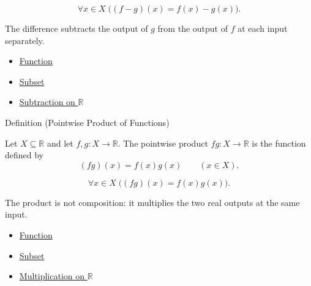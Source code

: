 \begin{remark*}
\[
  \forall x\in X\;\bigl((f-g)(x)=f(x)-g(x)\bigr).
\]
\end{remark*}

\begin{remark*}[Interpretation]
The difference subtracts the output of $g$ from the output of $f$ at each
input separately.
\end{remark*}

\begin{dependencies}
\begin{itemize}
  \item \hyperref[def:function]{Function}
  \item \hyperref[def:subset]{Subset}
  \item \hyperref[def:subtraction-on-r]{Subtraction on $\mathbb{R}$}
\end{itemize}
\end{dependencies}

\begin{definitionbox}{Definition (Pointwise Product of Functions)}
\begin{definition}
\label{def:pointwise-product-of-functions}
Let $X\subseteq\mathbb{R}$ and let $f,g:X\to\mathbb{R}$.  The
pointwise product $fg:X\to\mathbb{R}$ is the function defined by
\[
  (fg)(x)=f(x)g(x)
  \qquad (x\in X).
\]
\end{definition}
\end{definitionbox}

\begin{remark*}
\[
  \forall x\in X\;\bigl((fg)(x)=f(x)g(x)\bigr).
\]
\end{remark*}

\begin{remark*}[Interpretation]
The product is not composition: it multiplies the two real outputs at the
same input.
\end{remark*}

\begin{dependencies}
\begin{itemize}
  \item \hyperref[def:function]{Function}
  \item \hyperref[def:subset]{Subset}
  \item \hyperref[def:multiplication-on-r]{Multiplication on $\mathbb{R}$}
\end{itemize}
\end{dependencies}

